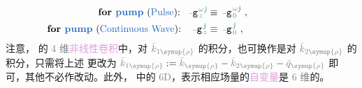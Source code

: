 \begin{subequations} \label{eq:Nondepleted-Pump-Approximation}
\begin{align}
	\hspace{-7em} \text{\textbf{for \textcolor{NavyBlue}{pump}} (\textcolor{NavyBlue}{Pulse}):} \hspace{0.65em} \xint{\begin{smallmatrix} ~ \\ {}^{}_{\mathcolor{gray}{-}} \\ ~ \end{smallmatrix}}{09}{\mathtt{g}}^{\;\! \mathcolor{gray}{\omega} \textcolor{PineGreen}{\hat{\jmath}}}_{\;\! \mathcolor{gray}{z}} &\equiv \xint{\begin{smallmatrix} ~ \\ {}^{}_{\mathcolor{gray}{-}} \\ ~ \end{smallmatrix}}{09}{\mathtt{g}}^{\;\!  \mathcolor{gray}{\omega} \textcolor{PineGreen}{\hat{\jmath}}}_{\;\! \mathcolor{gray}{0}} ~, \label{eq:Nondepleted-Pump-Approximation-spectrum} \\
	\hspace{-7em} \text{\textbf{for \textcolor{NavyBlue}{pump}} (\textcolor{NavyBlue}{Continuous Wave}):} \hspace{1em} \xint{\begin{smallmatrix} ~ \\ {}^{}_{\mathcolor{gray}{-}} \\ ~ \end{smallmatrix}}{09}{\mathtt{g}}^{\;\! \textcolor{PineGreen}{\hat{\jmath}}}_{\;\! \mathcolor{gray}{z}} &\equiv \xint{\begin{smallmatrix} ~ \\ {}^{}_{\mathcolor{gray}{-}} \\ ~ \end{smallmatrix}}{09}{\mathtt{g}}^{\;\! \textcolor{PineGreen}{\hat{\jmath}}}_{\;\! \mathcolor{gray}{0}} ~, \label{eq:Nondepleted-Pump-Approximation-discrete}
\end{align}
\end{subequations}
注意， 的 \textcolor{gray}{4 维}\textcolor{Plum}{非线性卷积}中，对 $\mathcolor{gray}{\bar{k}_{1\symup{\rho}}}$ 的积分，也可换作是对 $\mathcolor{gray}{\bar{k}_{2\symup{\rho}}}$ 的积分，只需将上述  更改为 $\mathcolor{gray}{\bar{k}_{1\symup{\rho}}} := \mathcolor{gray}{\bar{k}_{\symup{\rho}}} - \mathcolor{gray}{\bar{k}_{2\symup{\rho}}} - \mathcolor{gray}{\bar{q}_{\symup{\rho}}}$ 即可，其他不必作改动。此外， 中的 \textcolor{gray}{6D}，表示相应\textcolor{NavyBlue}{场量}的\textcolor{Plum}{自变量}是 \textcolor{gray}{6 维}的。

